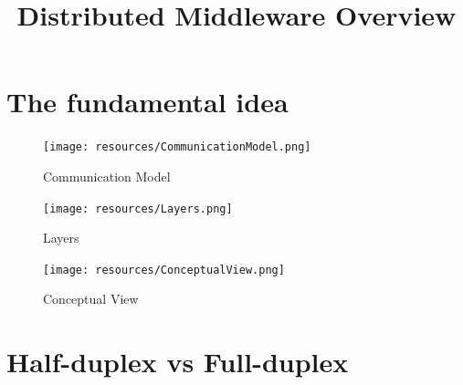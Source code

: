 \documentclass[unicode]{llncs}
\author{\authorname}
\title{Distributed Middleware Overview}
\institute{\societyname\\\addressfull\\\authoremail}
\newcommand{\labelsec}[1]{\label{sec:#1}}
\begin{document}
  \maketitle
  \clearpage

  \section{The fundamental idea}
  \labelsec{FundamentalIdea}

    \begin{figure}[H]
      \centering
      \texttt{[image: resources/CommunicationModel.png]}
      \caption{Communication Model}
    \end{figure}

    \begin{figure}[H]
      \centering
      \texttt{[image: resources/Layers.png]}
      \caption{Layers}
    \end{figure}

    \begin{figure}[H]
      \centering
      \texttt{[image: resources/ConceptualView.png]}
      \caption{Conceptual View}
    \end{figure}

  \section{Half-duplex vs Full-duplex}
  \labelsec{HalfFullDuplex}
\end{document}
